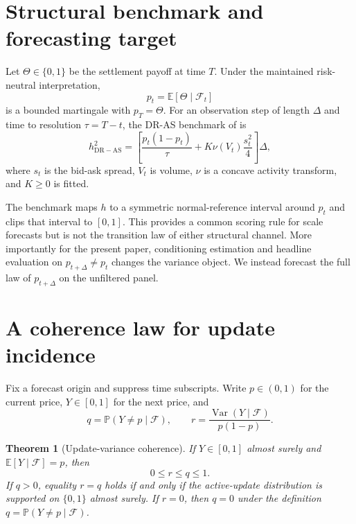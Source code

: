 \documentclass[11pt]{article}
\newtheorem{theorem}{Theorem}
\newcommand{\E}{\mathbb E}
\newcommand{\Pp}{\mathbb P}
\newcommand{\Var}{\operatorname{Var}}
\newcommand{\1}{\mathbb I}
\newcommand{\F}{\mathcal F}
\begin{document}
\section{Structural benchmark and forecasting target}

Let $\Theta\in\{0,1\}$ be the settlement payoff at time $T$. Under the maintained
risk-neutral interpretation,
\begin{equation}
p_t=\E[\Theta\mid\F_t]
\end{equation}
is a bounded martingale with $p_T=\Theta$. For an observation step of length
$\Delta$ and time to resolution $\tau=T-t$, the DR-AS benchmark of
\citet{xi2026volatility} is
\begin{equation}
h^2_{\mathrm{DR-AS}}
=\left[\frac{p_t(1-p_t)}{\tau}
+K\nu(V_t)\frac{s_t^2}{4}\right]\Delta,
\label{eq:dras}
\end{equation}
where $s_t$ is the bid-ask spread, $V_t$ is volume, $\nu$ is a concave activity
transform, and $K\ge0$ is fitted.

The benchmark maps $h$ to a symmetric normal-reference interval around $p_t$
and clips that interval to $[0,1]$. This provides a common scoring rule for scale
forecasts but is not the transition law of either structural channel. More
importantly for the present paper, conditioning estimation and headline
evaluation on $p_{t+\Delta}\ne p_t$ changes the variance object. We instead
forecast the full law of $p_{t+\Delta}$ on the unfiltered panel.

\section{A coherence law for update incidence}

Fix a forecast origin and suppress time subscripts. Write $p\in(0,1)$ for the
current price, $Y\in[0,1]$ for the next price, and
\begin{equation}
q=\Pp(Y\ne p\mid\F),\qquad
r=\frac{\Var(Y\mid\F)}{p(1-p)}.
\end{equation}

\begin{theorem}[Update-variance coherence]
\label{thm:coherence}
If $Y\in[0,1]$ almost surely and $\E[Y\mid\F]=p$, then
\begin{equation}
0\le r\le q\le1.
\label{eq:coherence}
\end{equation}
If $q>0$, equality $r=q$ holds if and only if the active-update distribution is
supported on $\{0,1\}$ almost surely. If $r=0$, then $q=0$ under the definition
$q=\Pp(Y\ne p\mid\F)$.
\end{theorem}
\end{document}
